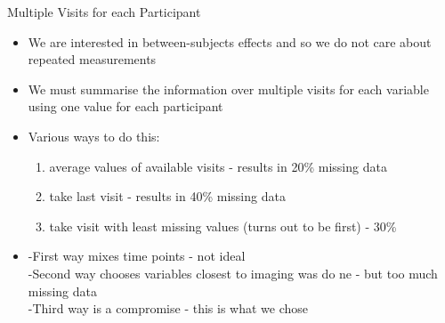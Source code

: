 \documentclass[10pt]{beamer} %
\begin{document}
\begin{frame}[plain]{Multiple Visits for each Participant}

\begin{itemize}
\item We are interested in between-subjects effects and so we do not care about repeated measurements \\

\vspace{0.3cm}

\item We must summarise the information over multiple visits for each variable using one value for each participant \\

\vspace{0.3cm}

\item Various ways to do this:

\vspace{0.3cm}

\begin{enumerate}
\item average values of available visits - results in 20\% missing data
\item take last visit - results in 40\% missing data
\item take visit with least missing values (turns out to be first) -  30\%
\end{enumerate} 

\vspace{0.3cm}

\item -First way mixes time points - not ideal \\ -Second way chooses variables closest to imaging was do	ne - but too much missing data \\ -Third way is a compromise - this is what we chose
\end{itemize}
\end{frame}
\end{document}

